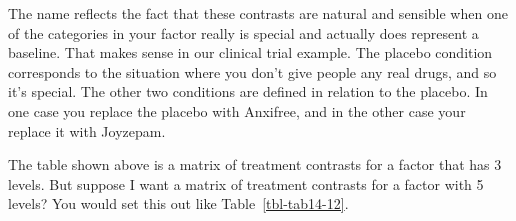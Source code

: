 \documentclass[
  a4paper,
]{book}
\begin{document}
The name reflects the fact that these contrasts are natural and sensible
when one of the categories in your factor really is special and actually
does represent a baseline. That makes sense in our clinical trial
example. The placebo condition corresponds to the situation where you
don't give people any real drugs, and so it's special. The other two
conditions are defined in relation to the placebo. In one case you
replace the placebo with Anxifree, and in the other case your replace it
with Joyzepam.

The table shown above is a matrix of treatment contrasts for a factor
that has 3 levels. But suppose I want a matrix of treatment contrasts
for a factor with 5 levels? You would set this out like
Table~\ref{tbl-tab14-12}.

\hypertarget{tbl-tab14-12}{}
 
  \providecommand{\huxb}[2]{\arrayrulecolor[RGB]{#1}\global\arrayrulewidth=#2pt}
  \providecommand{\huxvb}[2]{\color[RGB]{#1}\vrule width #2pt}
  \providecommand{\huxtpad}[1]{\rule{0pt}{#1}}
  \providecommand{\huxbpad}[1]{\rule[-#1]{0pt}{#1}}
\end{document}
